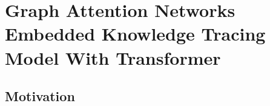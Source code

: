 \chapter{Graph Attention Networks Embedded Knowledge Tracing Model With Transformer}

\ifpdf
    \graphicspath{{Chapter3/Figs/Raster/}{Chapter3/Figs/PDF/}{Chapter3/Figs/}}
\else
    \graphicspath{{Chapter3/Figs/Vector/}{Chapter3/Figs/}}
\fi

\section{Motivation}

